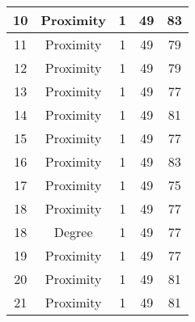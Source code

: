 \documentclass[results.tex]{subfiles}
\begin{document}
\begin{center}
\begin{tabular}{| c || c | c | c | c |}
            \hline
            10                      & Proximity                    & 1                      & 49                      & 83                   \\
            \hline
            11                      & Proximity                    & 1                      & 49                      & 79                   \\
            \hline
            12                      & Proximity                    & 1                      & 49                      & 79                   \\
            \hline
            13                      & Proximity                    & 1                      & 49                      & 77                   \\
            \hline
            14                      & Proximity                    & 1                      & 49                      & 81                   \\
            \hline
            15                      & Proximity                    & 1                      & 49                      & 77                   \\
            \hline
            16                      & Proximity                    & 1                      & 49                      & 83                   \\
            \hline
            17                      & Proximity                    & 1                      & 49                      & 75                   \\
            \hline
            18                      & Proximity                    & 1                      & 49                      & 77                   \\
            \hline
            18                      & Degree                       & 1                      & 49                      & 77                   \\
            \hline
            19                      & Proximity                    & 1                      & 49                      & 77                   \\
            \hline
            20                      & Proximity                    & 1                      & 49                      & 81                   \\
            \hline
            21                      & Proximity                    & 1                      & 49                      & 81                   \\

\end{tabular}
\end{center}
\end{document}
